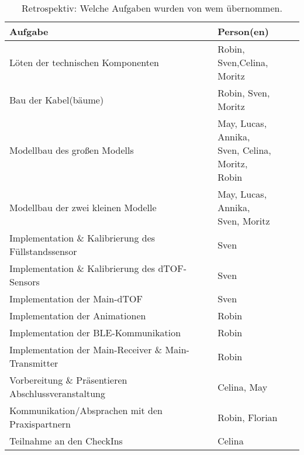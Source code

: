    \begin{table}[H]
        \centering
        \begin{tabularx}{\textwidth}{ | l | X | }                
            \hline
                \textbf{Aufgabe} & \textbf{Person(en)} \\
            \hline
                Löten der technischen Komponenten &  \makecell[l]{Robin, Sven,Celina,\\Moritz} \\ 
            \hline
                Bau der Kabel(bäume) &  Robin, Sven, Moritz \\ 
            \hline
                Modellbau des großen Modells & \makecell[l]{May, Lucas, Annika,\\ Sven, Celina, Moritz,\\Robin} \\ 
            \hline
                Modellbau der zwei kleinen Modelle & \makecell[l]{May, Lucas, Annika,\\Sven, Moritz} \\ 
            \hline
                Implementation \& Kalibrierung des Füllstandssensor & Sven \\
            \hline
                Implementation \& Kalibrierung des dTOF-Sensors & Sven \\
            \hline
                Implementation der Main-dTOF & Sven \\
            \hline
                Implementation der Animationen & Robin \\
            \hline
                Implementation der BLE-Kommunikation & Robin \\
            \hline
                Implementation der Main-Receiver \& Main-Transmitter & Robin \\
            \hline
                Vorbereitung \& Präsentieren Abschlussveranstaltung & Celina, May \\
            \hline
                Kommunikation/Absprachen mit den Praxispartnern & Robin, Florian \\
            \hline
                Teilnahme an den CheckIns & Celina \\
            \hline
        \end{tabularx}
        \caption{Retrospektiv: Welche Aufgaben wurden von wem übernommen.}
        \label{table:detailed_task_}
    \end{table}